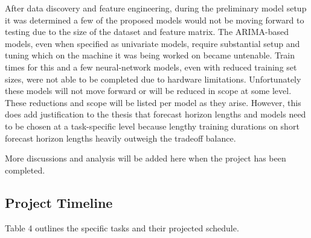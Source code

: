 \documentclass[sigconf]{acmart}
\begin{document}
After data discovery and feature engineering, during the preliminary model setup it was determined a few of the proposed models would not be moving forward to testing due to the size of the dataset and feature matrix. The ARIMA-based models, even when specified as univariate models, require substantial setup and tuning which on the machine it was being worked on became untenable. Train times for this and a few neural-network models, even with reduced training set sizes, were not able to be completed due to hardware limitations. Unfortunately these models will not move forward or will be reduced in scope at some level. These reductions and scope will be listed per model as they arise. However, this does add justification to the thesis that forecast horizon lengths and models need to be chosen at a task-specific level because lengthy training durations on short forecast horizon lengths heavily outweigh the tradeoff balance.

More discussions and analysis will be added here when the project has been completed.

\subsection{Project Timeline}

Table 4 outlines the specific tasks and their projected schedule.
\end{document}
